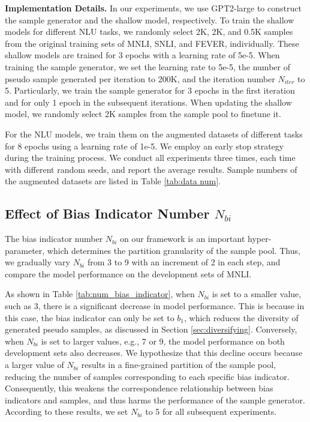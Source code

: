 \documentclass[11pt]{article}
\begin{document}


\indent \textbf{Implementation Details.}
In our experiments, we use GPT2-large \cite{radford2019language}
to construct the sample generator and the shallow model, respectively.
To train the shallow models for different NLU tasks, we randomly select 2K, 2K, and 0.5K samples from the original training sets of MNLI, SNLI, and FEVER, individually. These shallow models are trained for 3 epochs with a learning rate of 5e-5.
When training the sample generator, we set the learning rate to 5e-5, the number of pseudo sample generated per iteration to 200K, and the iteration number $N_{iter}$ to 5.
Particularly, we train the sample generator for 3 epochs in the first iteration and for only 1 epoch in the subsequent iterations.
When updating the shallow model, we randomly select 2K samples from the sample pool to finetune it.

For the NLU models, we train them on the augmented datasets of different tasks for 8 epochs using a learning rate of 1e-5. We employ an early stop strategy during the training process. We conduct all experiments three times, each time with different random seeds, and report the average results.
Sample numbers of the augmented datasets are listed in Table \ref{tab:data num}.

\subsection{Effect of Bias Indicator Number $N_{bi}$}
The bias indicator number $N_{bi}$ on our framework is an important hyper-parameter, which determines the partition granularity of the sample pool.
Thus, we gradually vary $N_{bi}$ from 3 to 9 with an increment of 2 in each step, and compare the model performance on the development sets of MNLI. 

As shown in Table \ref{tab:num_bias_indicator}, when $N_{bi}$ is set to a smaller value, such as 3, there is a significant decrease in model performance. This is because in this case, the bias indicator can only be set to $b_1$, which reduces the diversity of generated pseudo samples, as discussed in Section \ref{sec:diversifying}. Conversely, when $N_{bi}$ is set to larger values, e.g., 7 or 9, the model performance on both development sets also decreases. We hypothesize that this decline occurs because a larger value of $N_{bi}$ results in a fine-grained partition of the sample pool, reducing the number of samples corresponding to each specific bias indicator. Consequently, this weakens the correspondence relationship between bias indicators and samples, and thus harms the performance of the sample generator. According to these results, we set $N_{bi}$ to 5 for all subsequent experiments.
\end{document}
